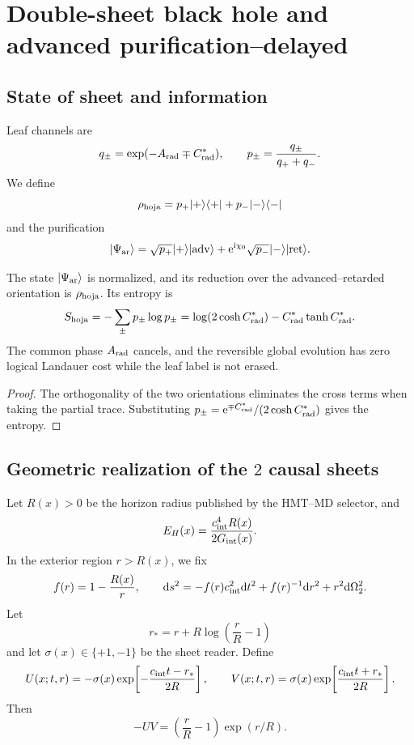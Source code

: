\section{Double-sheet black hole and advanced purification--delayed}
\label{sec:hmtf2-agujero-negro}

\subsection{State of sheet and information}

Leaf channels are
\[
 q_\pm=\exp(-A_{\rm rad}\mp C_{\rm rad}^*),\qquad
 p_\pm=\frac{q_\pm}{q_++q_-}.
\]
We define
\[
 \rho_{\rm hoja}
 =p_+|+\rangle\langle+|+p_-|-\rangle\langle-|
\]
and the purification
\[
 |\Psi_{\rm ar}\rangle
 =\sqrt{p_+}|+\rangle|{\rm adv}\rangle
 +\mathrm e^{{\rm i}\chi_0}
  \sqrt{p_-}|-\rangle|{\rm ret}\rangle.
\]

\begin{proposition}
\label{prop:hmtf2-purificacion-hojas}
The state \(|\Psi_{\rm ar}\rangle\) is normalized, and its reduction over the
advanced--retarded orientation is \(\rho_{\rm hoja}\). Its entropy is
\[
 S_{\rm hoja}
 =-\sum_\pm p_\pm\log p_\pm
 =\log(2\cosh C_{\rm rad}^*)
  -C_{\rm rad}^*\tanh C_{\rm rad}^*.
\]
The common phase \(A_{\rm rad}\) cancels, and the reversible global evolution
has zero logical Landauer cost while the leaf label is not erased.
\end{proposition}

\begin{proof}
The orthogonality of the two orientations eliminates the cross terms when
taking the partial trace. Substituting
\(p_\pm=\mathrm e^{\mp C_{\rm rad}^*}/(2\cosh C_{\rm rad}^*)\) gives the
entropy.
\end{proof}

\subsection{Geometric realization of the \(2\) causal sheets}

Let \(R(x)>0\) be the horizon radius published by the HMT--MD selector, and
\[
 E_H(x)=\frac{c_{\rm int}^4R(x)}{2G_{\rm int}(x)}.
\]
In the exterior region \(r>R(x)\), we fix
\[
 f(r)=1-\frac{R(x)}r,\qquad
 \mathrm ds^2=-f(r)c_{\rm int}^2\mathrm dt^2
 +f(r)^{-1}\mathrm dr^2+r^2\mathrm d\Omega_2^2.
\]
Let
\[
 r_*=r+R\log\!\left(\frac rR-1\right)
\]
and let \(\sigma(x)\in\{+1,-1\}\) be the sheet reader. Define
\[
 U(x;t,r)
 =-\sigma(x)\exp\!\left[-\frac{c_{\rm int}t-r_*}{2R}\right],
 \qquad
 V(x;t,r)
 = \sigma(x)\exp\!\left[\frac{c_{\rm int}t+r_*}{2R}\right].
\]
Then
\[
 -UV=\left(\frac rR-1\right)\exp(r/R).
\]

